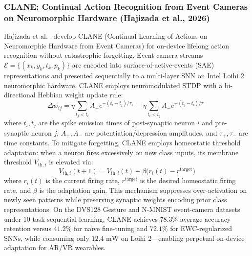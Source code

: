 \subsubsection{CLANE: Continual Action Recognition from Event Cameras on Neuromorphic Hardware (Hajizada et al., 2026)}
Hajizada et al.~\cite{Hajizada2026CLANE} develop CLANE (Continual Learning of Actions on Neuromorphic Hardware from Event Cameras) for on-device lifelong action recognition without catastrophic forgetting. Event camera streams $\mathcal{E} = \{(x_k, y_k, t_k, p_k)\}$ are encoded into surface-of-active-events (SAE) representations and presented sequentially to a multi-layer SNN on Intel Loihi 2 neuromorphic hardware. CLANE employs neuromodulated STDP with a bi-directional Hebbian weight update rule:
\begin{equation}
    \Delta w_{ij} = \eta \sum_{t_j < t_i} A_+ e^{-(t_i - t_j)/\tau_+} - \eta \sum_{t_i < t_j} A_- e^{-(t_j - t_i)/\tau_-}
\end{equation}
where $t_i, t_j$ are the spike emission times of post-synaptic neuron $i$ and pre-synaptic neuron $j$, $A_+, A_-$ are potentiation/depression amplitudes, and $\tau_+, \tau_-$ are time constants. To mitigate forgetting, CLANE employs homeostatic threshold adaptation: when a neuron fires excessively on new class inputs, its membrane threshold $V_{\text{th},i}$ is elevated via:
\begin{equation}
    V_{\text{th},i}(t+1) = V_{\text{th},i}(t) + \beta \bigl(r_i(t) - r^{\text{target}}\bigr)
\end{equation}
where $r_i(t)$ is the current firing rate, $r^{\text{target}}$ is the desired homeostatic firing rate, and $\beta$ is the adaptation gain. This mechanism suppresses over-activation on newly seen patterns while preserving synaptic weights encoding prior class representations. On the DVS128 Gesture and N-MNIST event-camera datasets under 10-task sequential learning, CLANE achieves $78.3\%$ average accuracy retention versus $41.2\%$ for na\"ive fine-tuning and $72.1\%$ for EWC-regularized SNNs, while consuming only $12.4\text{ mW}$ on Loihi 2---enabling perpetual on-device adaptation for AR/VR wearables.

